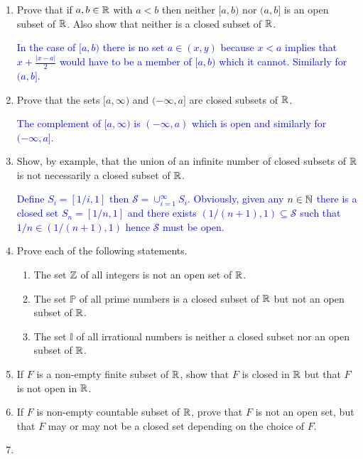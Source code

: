 \documentclass[10pt,a4paper]{report}
\newcommand{\BLUE}[1]{\textcolor{blue}{#1}}
\begin{document}
\begin{enumerate}

\item Prove that if $a,b \in \mathbb{R}$ with $a < b$ then neither $[a,b)$ nor $(a,b]$ is an open subset of $\mathbb{R}$.  Also show that neither is a closed subset of $\mathbb{R}$.

\BLUE{In the case of $[a,b)$ there is no set $a \in (x,y)$ because $x < a$ implies that $x+\frac{|x-a|}{2}$ would have to be a member of $[a,b)$ which it cannot.  Similarly for $(a,b]$. }

\item Prove that the sets $[a,\infty)$ and $(-\infty, a]$ are closed subsets of $\mathbb{R}$.

\BLUE{The complement of $[a,\infty)$ is $(-\infty, a)$ which is open and similarly for $(-\infty, a]$.}

\item Show, by example, that the union of an infinite number of closed subsets of $\mathbb{R}$ is not necessarily a closed subset of $\mathbb{R}$.

\BLUE{Define $S_i = [1/i, 1]$ then $\mathcal{S} = \cup_{i=1}^\infty S_i$.  Obviously, given any $n \in \mathbb{N}$ there is a closed set $S_n=[1/n, 1]$ and there exists $(1/(n+1),1) \subseteq \mathcal{S}$ such that $1/n \in  (1/(n+1),1)$ hence $\mathcal{S}$ must be open.}

\item Prove each of the following statements.
\begin{enumerate}[label=(\roman*)]
	\item The set $\mathbb{Z}$ of all integers is not an open set of $\mathbb{R}$.
	\item The set $\mathbb{P}$ of all prime numbers is a closed subset of $\mathbb{R}$ but not an open subset of $\mathbb{R}$.
	\item The set $\mathbb{I}$ of all irrational numbers is neither a closed subset nor an open subset of $\mathbb{R}$.
\end{enumerate}

\item If $F$ is a non-empty finite subset of $\mathbb{R}$, show that $F$ is closed in $\mathbb{R}$ but that $F$ is not open in $\mathbb{R}$.

\item If $F$ is non-empty countable subset of $\mathbb{R}$, prove that $F$ is not an open set, but that $F$ may or may not be a closed set depending on the choice of $F$.

\item \begin{enumerate}[label=(\roman*)]


\end{enumerate}
\end{enumerate}
\end{document}
